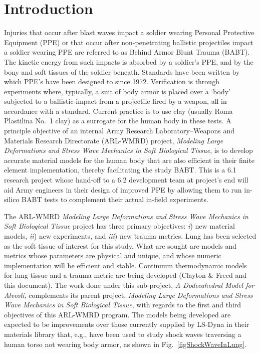 \part{Introduction}
\label{partIntroduction}

Injuries that occur after blast waves impact a soldier wearing Personal Protective Equipment (PPE) or that occur after non-penetrating ballistic projectiles impact a soldier wearing PPE are referred to as Behind Armor Blunt Trauma (BABT).  The kinetic energy from such impacts is absorbed by a soldier's PPE, and by the bony and soft tissues of the soldier beneath.  Standards have been written by which PPE's have been designed to since 1972.  Verification is through experiments where, typically, a suit of body armor is placed over a `body' subjected to a ballistic impact from a projectile fired by a weapon, all in accordance with a standard.  Current practice is to use clay (usually Roma Plastilina No.~1 clay) as a surrogate for the human body in these tests.  A principle objective of an internal Army Research Laboratory--Weapons and Materials Research Directorate (ARL-WMRD) project, \textit{Modeling Large Deformations and Stress Wave Mechanics in Soft Biological Tissue}, is to develop accurate material models for the human body that are also efficient in their finite element implementation, thereby facilitating the study BABT.  This is a 6.1 research project whose hand-off to a 6.2 development team at project's end will aid Army engineers in their design of improved PPE by allowing them to run in-silico BABT tests to complement their actual in-field experiments.

The ARL-WMRD \textit{Modeling Large Deformations and Stress Wave Mechanics in Soft Biological Tissue\/} project has three primary objectives: \textit{i\/}) new material models, \textit{ii\/}) new experiments, and \textit{iii\/}) new trauma metrics.  Lung has been selected as the soft tissue of interest for this study.  What are sought are models and metrics whose parameters are physical and unique, and whose numeric implementation will be efficient and stable.  Continuum thermo\-dynamic models for lung tissue and a trauma metric are being developed (Clayton \& Freed \cite{ClaytonFreed19,ClaytonFreed20} and this document).  The work done under this sub-project, \textit{A Dodecahedral Model for Alveoli}, complements its parent project, \textit{Modeling Large Deformations and Stress Wave Mechanics in Soft Biological Tissue}, with regards to the first and third objectives of this ARL-WMRD program.  The models being developed are expected to be improvements over those currently supplied by LS-Dyna in their materials library that, e.g., have been used to study shock waves traversing a human torso not wearing body armor, as shown in Fig.~\ref{figShockWaveInLung}.

